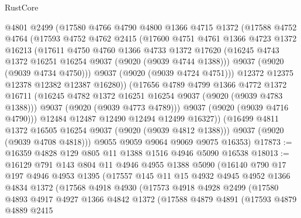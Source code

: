 \begin{lexlean}{RustCore}
\begin{coremodule}
            @4801
            @2499
            (@17580
              @4766
              @4790
              @4800
              @1366
              @4715
              @1372
              (@17588
                @4752
                @4764
                (@17593
                  @4752
                  @4762
                  @2415
                  (@17600
                    @4751
                    @4761
                    @1366
                    @4723
                    @1372
                    @16213
                    (@17611
                      @4750
                      @4760
                      @1366
                      @4733
                      @1372
                      @17620
                      (@16245 @4743 @1372 @16251 @16254 @9037 (@9020 (@9039 @4744 @1388)))
                      @9037
                      (@9020 (@9039 @4734 @4750)))
                    @9037
                    (@9020 (@9039 @4724 @4751)))
                  @12372
                  @12375
                  @12378
                  @12382
                  @12387
                  @16280))
              (@17656
                @4789
                @4799
                @1366
                @4772
                @1372
                @16711
                (@16245 @4782 @1372 @16251 @16254 @9037 (@9020 (@9039 @4783 @1388)))
                @9037
                (@9020 (@9039 @4773 @4789)))
              @9037
              (@9020 (@9039 @4716 @4790)))
            @12484
            @12487
            @12490
            @12494
            @12499
            @16327))
        (@16499 @4811 @1372 @16505 @16254 @9037 (@9020 (@9039 @4812 @1388)))
        @9037
        (@9020 (@9039 @4708 @4818)))
      @9055
      @9059
      @9064
      @9069
      @9075
      @16353)
@17873 := @16359 @4828 @129 @805 @11 @1388 @1516 @4946 @5090 @16538
@18013 := @16129
    @791
    @143
    @804
    @11
    @4946
    @4955
    @1388
    @5090
    (@16140
      @790
      @17
      @197
      @4946
      @4953
      @1395
      (@17557
        @145
        @11
        @15
        @4932
        @4945
        @4952
        @1366
        @4834
        @1372
        (@17568
          @4918
          @4930
          (@17573
            @4918
            @4928
            @2499
            (@17580
              @4893
              @4917
              @4927
              @1366
              @4842
              @1372
              (@17588
                @4879
                @4891
                (@17593
                  @4879
                  @4889
                  @2415

\end{coremodule}
\end{lexlean}
